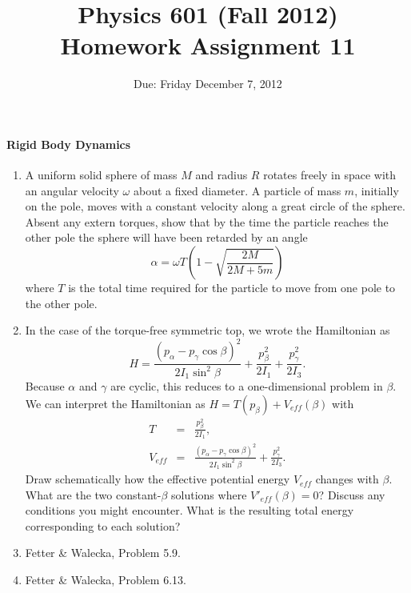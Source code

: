 \documentclass[letterpaper,11pt]{article}
\title{Physics 601 (Fall 2012) \\ Homework Assignment 11}
\date{Due: Friday December 7, 2012}
\begin{document}
\maketitle

\paragraph*{Rigid Body Dynamics}
\begin{enumerate}
 \item A uniform solid sphere of mass $M$ and radius $R$ rotates freely in space with an angular velocity $\omega$ about a fixed diameter.  A particle of mass $m$, initially on the pole, moves with a constant velocity along a great circle of the sphere.  Absent any extern torques, show that by the time the particle reaches the other pole the sphere will have been retarded by an angle
 \begin{equation*}
  \alpha = \omega T \left( 1 - \sqrt{\frac{2M}{2M + 5m}} \right)
 \end{equation*}
 where $T$ is the total time required for the particle to move from one pole to the other pole.
 \item In the case of the torque-free symmetric top, we wrote the Hamiltonian as
 \begin{equation*}
  H = \frac{(p_\alpha - p_\gamma\cos\beta)^2}{2 I_1 \sin^2\beta} + \frac{p^2_\beta}{2 I_1} + \frac{p^2_\gamma}{2 I_3}.
 \end{equation*}
 Because $\alpha$ and $\gamma$ are cyclic, this reduces to a one-dimensional problem in $\beta$.  We can interpret the Hamiltonian as $H = T(p_\beta) + V_{eff}(\beta)$ with
 \begin{eqnarray*}
  T & = & \frac{p^2_\beta}{2 I_1}, \\
  V_{eff} & = & \frac{(p_\alpha - p_\gamma\cos\beta)^2}{2 I_1 \sin^2\beta} + \frac{p^2_\gamma}{2 I_3}.
 \end{eqnarray*}
 Draw schematically how the effective potential energy $V_{eff}$ changes with $\beta$.  What are the two constant-$\beta$ solutions where $V'_{eff}(\beta) = 0$?  Discuss any conditions you might encounter.  What is the resulting total energy corresponding to each solution?
 \item Fetter \& Walecka, Problem 5.9.
 \item Fetter \& Walecka, Problem 6.13.
\end{enumerate}
\end{document}
